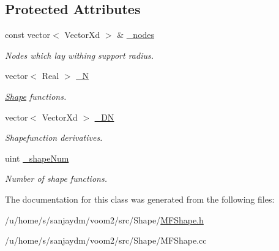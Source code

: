 \subsection*{Protected Attributes}
\begin{DoxyCompactItemize}
\item 
\hypertarget{classvoom_1_1_m_f_shape_a4619a9546595c6b145cf392af4c3db84}{
const vector$<$ VectorXd $>$ \& \hyperlink{classvoom_1_1_m_f_shape_a4619a9546595c6b145cf392af4c3db84}{\_\-nodes}}
\label{classvoom_1_1_m_f_shape_a4619a9546595c6b145cf392af4c3db84}

\begin{DoxyCompactList}\small\item\em Nodes which lay withing support radius. \item\end{DoxyCompactList}\item 
\hypertarget{classvoom_1_1_m_f_shape_a01e0c0a865df4a28dba1cb6090b378d1}{
vector$<$ Real $>$ \hyperlink{classvoom_1_1_m_f_shape_a01e0c0a865df4a28dba1cb6090b378d1}{\_\-N}}
\label{classvoom_1_1_m_f_shape_a01e0c0a865df4a28dba1cb6090b378d1}

\begin{DoxyCompactList}\small\item\em \hyperlink{classvoom_1_1_shape}{Shape} functions. \item\end{DoxyCompactList}\item 
\hypertarget{classvoom_1_1_m_f_shape_a32c93d0524d948aea780f47f04e52031}{
vector$<$ VectorXd $>$ \hyperlink{classvoom_1_1_m_f_shape_a32c93d0524d948aea780f47f04e52031}{\_\-DN}}
\label{classvoom_1_1_m_f_shape_a32c93d0524d948aea780f47f04e52031}

\begin{DoxyCompactList}\small\item\em Shapefunction derivatives. \item\end{DoxyCompactList}\item 
\hypertarget{classvoom_1_1_m_f_shape_a1ac2531795f772861be14e5c63365ab5}{
uint \hyperlink{classvoom_1_1_m_f_shape_a1ac2531795f772861be14e5c63365ab5}{\_\-shapeNum}}
\label{classvoom_1_1_m_f_shape_a1ac2531795f772861be14e5c63365ab5}

\begin{DoxyCompactList}\small\item\em Number of shape functions. \item\end{DoxyCompactList}\end{DoxyCompactItemize}


The documentation for this class was generated from the following files:\begin{DoxyCompactItemize}
\item 
/u/home/s/sanjaydm/voom2/src/Shape/\hyperlink{_m_f_shape_8h}{MFShape.h}\item 
/u/home/s/sanjaydm/voom2/src/Shape/MFShape.cc\end{DoxyCompactItemize}
